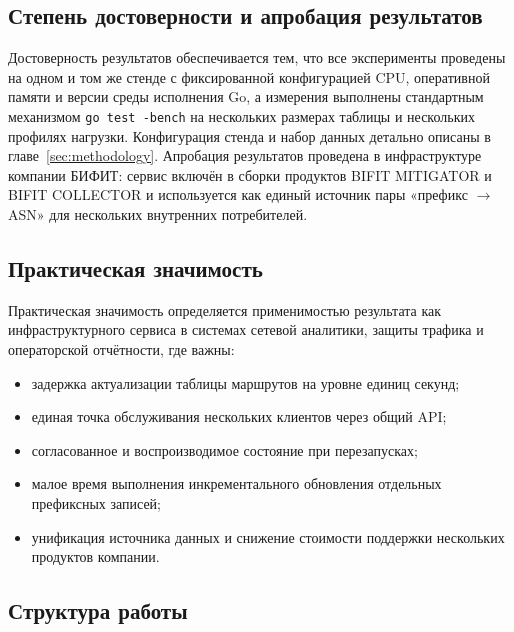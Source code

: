 \subsection*{Степень достоверности и апробация результатов}

Достоверность результатов обеспечивается тем, что все эксперименты
проведены на одном и том же стенде с фиксированной конфигурацией CPU,
оперативной памяти и версии среды исполнения Go, а измерения выполнены
стандартным механизмом \texttt{go test -bench} на нескольких размерах
таблицы и нескольких профилях нагрузки. Конфигурация стенда и набор
данных детально описаны в главе~\ref{sec:methodology}.
Апробация результатов проведена в инфраструктуре компании БИФИТ:
сервис включён в сборки продуктов BIFIT MITIGATOR и BIFIT COLLECTOR
и используется как единый источник пары «префикс $\rightarrow$ ASN»
для нескольких внутренних потребителей.

\subsection*{Практическая значимость}

Практическая значимость определяется применимостью результата как
инфраструктурного сервиса в системах сетевой аналитики, защиты
трафика и операторской отчётности, где важны:

\begin{itemize}
\item задержка актуализации таблицы маршрутов на уровне единиц секунд;
\item единая точка обслуживания нескольких клиентов через общий API;
\item согласованное и воспроизводимое состояние при перезапусках;
\item малое время выполнения инкрементального обновления отдельных
префиксных записей;
\item унификация источника данных и снижение стоимости поддержки
нескольких продуктов компании.
\end{itemize}

\subsection*{Структура работы}

